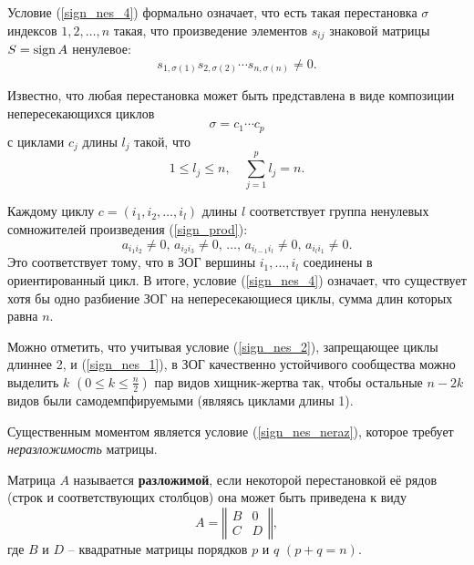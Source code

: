    Условие (\ref{sign_nes_4}) формально означает, что есть такая перестановка \(\sigma\) индексов \(1,2,\dots,n\) такая, что произведение элементов \(s_{ij}\) знаковой матрицы \(S = \operatorname{sign} A\) ненулевое:
    \begin{equation} \label{sign_prod}
        s_{1, \sigma(1)} s_{2, \sigma(2)} \cdots s_{n, \sigma(n)} \neq 0.
    \end{equation}

    Известно, что любая перестановка может быть представлена в виде композиции непересекающихся циклов
    \begin{equation*}
        \sigma = c_1 \cdots c_p
    \end{equation*}
    с циклами \(c_j\) длины \(l_j\) такой, что 
    \begin{equation*}
        1 \leq l_j \leq n, \quad \sum_{j=1}^{p} l_j = n.
    \end{equation*}

    Каждому циклу \(c = (i_1, i_2, \dots, i_l)\) длины \(l\) соответствует группа ненулевых сомножителей произведения (\ref{sign_prod}):
    \begin{equation*}
        a_{i_1 i_2} \neq 0, \, a_{i_2 i_3} \neq 0, \, \dots, \, a_{i_{l-1} i_{l}} \neq 0, \, a_{i_l i_1} \neq 0.
    \end{equation*}
    Это соответствует тому, что в ЗОГ вершины \(i_1, \dots, i_l\) соединены в ориентированный цикл. В итоге, условие (\ref{sign_nes_4}) означает, что существует хотя бы одно разбиение ЗОГ на непересекающиеся циклы, сумма длин которых равна \(n\).

    Можно отметить, что учитывая условие (\ref{sign_nes_2}), запрещающее циклы длиннее 2, и (\ref{sign_nes_1}), в ЗОГ качественно устойчивого сообщества можно выделить \(k\) \( \left( 0 \leq k \leq \frac{n}{2} \right)\) пар видов хищник-жертва так, чтобы остальные \(n - 2k\) видов были самодемпфируемыми (являясь циклами длины 1).

    Существенным моментом является условие (\ref{sign_nes_neraz}), которое требует \textit{неразложимость} матрицы. 

    \begin{definition}
        Матрица \(A\) называется \textbf{разложимой}, если некоторой перестановкой её рядов (строк и соответствующих столбцов) она может быть приведена к виду
        \begin{equation}
            A = \left\Vert \begin{matrix}
                B & 0 \\
                C & D
            \end{matrix} \right\Vert,
        \end{equation}
        где \(B\) и \(D\) -- квадратные матрицы порядков \(p\) и \(q\) \((p+q = n)\).
    \end{definition}


